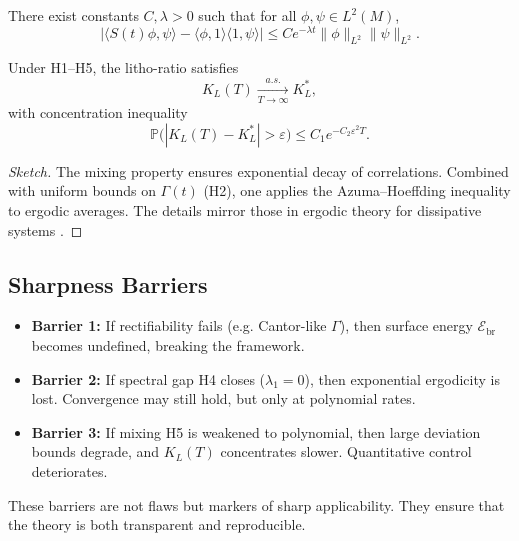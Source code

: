 \begin{assumption}
There exist constants $C,\lambda>0$ such that for all $\phi,\psi \in L^2(M)$,
\[
\big| \langle S(t)\phi,\psi \rangle - \langle \phi,1 \rangle \langle 1,\psi \rangle \big|
\leq C e^{-\lambda t} \|\phi\|_{L^2}\|\psi\|_{L^2}.
\]
\end{assumption}

\begin{theorem}
\label{thm:ergodic-limit}
Under H1–H5, the litho-ratio satisfies
\[
K_L(T) \xrightarrow[T\to\infty]{a.s.} K_L^*,
\]
with concentration inequality
\[
\mathbb{P}\big( |K_L(T) - K_L^*| > \varepsilon \big) \leq
C_1 e^{-C_2 \varepsilon^2 T}.
\]
\end{theorem}

\begin{proof}[Sketch]
The mixing property ensures exponential decay of correlations.
Combined with uniform bounds on $\Gamma(t)$ (H2), one applies the
Azuma–Hoeffding inequality to ergodic averages. The details mirror
those in ergodic theory for dissipative systems \cite{petersen1989ergodic}.
\end{proof}

\bigskip


\subsection{Sharpness Barriers}
\label{sec:sharpness}

\begin{itemize}
\item \textbf{Barrier 1:} If rectifiability fails (e.g. Cantor-like $\Gamma$),
then surface energy $\mathcal{E}_{\mathrm{br}}$ becomes undefined,
breaking the framework.

\item \textbf{Barrier 2:} If spectral gap H4 closes ($\lambda_1=0$),
then exponential ergodicity is lost. Convergence may still hold,
but only at polynomial rates.

\item \textbf{Barrier 3:} If mixing H5 is weakened to polynomial,
then large deviation bounds degrade, and $K_L(T)$ concentrates
slower. Quantitative control deteriorates.
\end{itemize}

\begin{remark}
These barriers are not flaws but markers of sharp applicability.
They ensure that the theory is both transparent and reproducible.
\end{remark}

